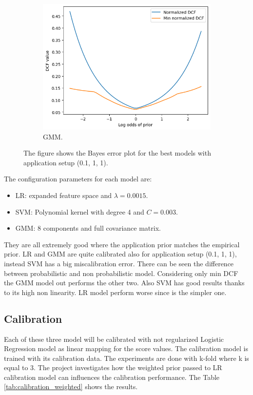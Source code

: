 \documentclass{article}
\begin{document}
\begin{figure}[ht]
\begin{subfigure}[b]{0.3\textwidth}
        \includegraphics[width=\textwidth]{images/gmm_bayes_error.png}
        \caption{GMM.}
    \end{subfigure}
    \caption{The figure shows the Bayes error plot for the best models with application setup (0.1, 1, 1).}
    \label{fig:models_bayes_error}
\end{figure}

The configuration parameters for each model are:
\begin{itemize}
    \item LR: expanded feature space and $\lambda = 0.0015$.
    \item SVM: Polynomial kernel with degree 4 and $C = 0.003$.
    \item GMM: 8 components and full covariance matrix.
\end{itemize}

They are all extremely good where the application prior matches the empirical prior. LR and GMM are quite calibrated also for application setup (0.1, 1, 1), instead SVM has a big miscalibration error. There can be seen the difference between probabilistic and non probabilistic model. Considering only min DCF the GMM model out performs the other two. Also SVM has good results thanks to its high non linearity. LR model perform worse since is the simpler one.

\subsection{Calibration}
Each of these three model will be calibrated with not regularized Logistic Regression model as linear mapping for the score values. The calibration model is trained with its calibration data. The experiments are done with k-fold where k is equal to 3. The project investigates how the weighted prior passed to LR calibration model can influences the calibration performance. The Table \ref{tab:calibration_weighted} shows the results. 
\end{document}

